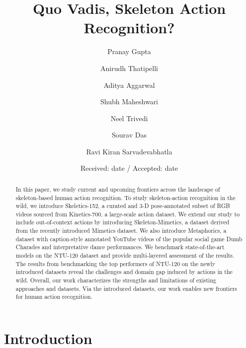 \documentclass[twocolumn]{svjour3}          \smartqed  \usepackage{graphicx}
\begin{document}
\title{Quo Vadis, Skeleton Action Recognition?}




\author{Pranay Gupta         \and
        Anirudh Thatipelli   \and
        Aditya Aggarwal      \and
        Shubh Maheshwari     \and
        Neel Trivedi         \and
        Sourav Das           \and
        Ravi Kiran Sarvadevabhatla
}




\date{Received: date / Accepted: date}



\maketitle

\begin{abstract}
In this paper, we study current and upcoming frontiers across the landscape of skeleton-based human action recognition. To study skeleton-action recognition in the wild, we introduce Skeletics-152, a curated and 3-D pose-annotated subset of RGB videos sourced from Kinetics-700, a large-scale action dataset. We extend our study to include out-of-context actions by introducing Skeleton-Mimetics, a dataset derived from the recently introduced Mimetics dataset. We also introduce Metaphorics, a dataset with caption-style annotated YouTube videos of the popular social game Dumb Charades and interpretative dance performances. We benchmark state-of-the-art models on the NTU-120 dataset and provide multi-layered  assessment of the results. The results from benchmarking the top performers of NTU-120 on the newly introduced datasets reveal the challenges and domain gap induced by actions in the wild.  Overall, our work characterizes the strengths and limitations of existing approaches and datasets. Via the introduced datasets, our work enables new frontiers for human action recognition. 
\end{abstract}

\section{Introduction}
\label{sec:introduction}
\end{document}
